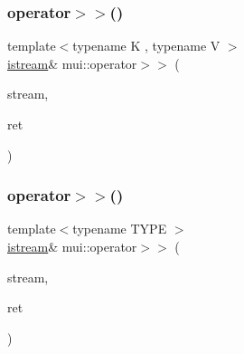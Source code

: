 \mbox{\label{namespacemui_a13db2bc280275da1dd3451579528983e}} 
\subsubsection{\texorpdfstring{operator$>$$>$()}{operator>>()}\hspace{0.1cm}{\footnotesize\ttfamily [2/20]}}
{\footnotesize\ttfamily template$<$typename K , typename V $>$ \\
\hyperlink{classmui_1_1istream}{istream}\& mui\+::operator$>$$>$ (\begin{DoxyParamCaption}\item[{\hyperlink{classmui_1_1istream}{istream} \&}]{stream,  }\item[{std\+::map$<$ K, V $>$ \&}]{ret }\end{DoxyParamCaption})\hspace{0.3cm}{\ttfamily [inline]}}

\mbox{\label{namespacemui_af482c6c6fae6770318a0d4937cb05cf9}} 
\subsubsection{\texorpdfstring{operator$>$$>$()}{operator>>()}\hspace{0.1cm}{\footnotesize\ttfamily [3/20]}}
{\footnotesize\ttfamily template$<$typename T\+Y\+PE $>$ \\
\hyperlink{classmui_1_1istream}{istream}\& mui\+::operator$>$$>$ (\begin{DoxyParamCaption}\item[{\hyperlink{classmui_1_1istream}{istream} \&}]{stream,  }\item[{std\+::vector$<$ T\+Y\+PE $>$ \&}]{ret }\end{DoxyParamCaption})\hspace{0.3cm}{\ttfamily [inline]}}

\mbox{\label{namespacemui_a76360653d74f0b73ebc129f988f8f0d2}} 
